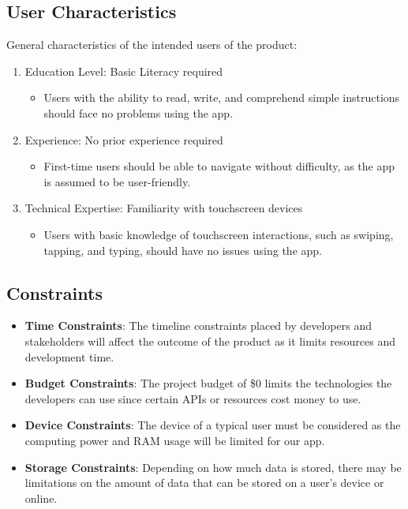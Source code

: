 \documentclass[]{article}
\begin{document}
\subsection{User Characteristics}
\label{sub:user_characteristics}
General characteristics of the intended users of the product:
\begin{enumerate}
	\item Education Level: Basic Literacy required
	\begin{itemize}
		\item Users with the ability to read, write, and comprehend simple instructions should face no problems using the app.
	\end{itemize}
	\item Experience: No prior experience required
	\begin{itemize}
		\item First-time users should be able to navigate without difficulty, as the app is assumed to be user-friendly.
	\end{itemize}
	\item Technical Expertise: Familiarity with touchscreen devices
	\begin{itemize}
		\item Users with basic knowledge of touchscreen interactions, such as swiping, tapping, and typing, should have no issues using the app.
	\end{itemize}
\end{enumerate}

\subsection{Constraints}
\label{sub:constraints}
\begin{itemize}
    \item \textbf{Time Constraints}: The timeline constraints placed by developers and stakeholders will affect the outcome of the product as it limits resources and development time.
    \item \textbf{Budget Constraints}: The project budget of \$0 limits the technologies the developers can use since certain APIs or resources cost money to use.
    \item \textbf{Device Constraints}: The device of a typical user must be considered as the computing power and RAM usage will be limited for our app.
    \item \textbf{Storage Constraints}: Depending on how much data is stored, there may be limitations on the amount of data that can be stored on a user’s device or online.
\end{itemize}
\end{document}
